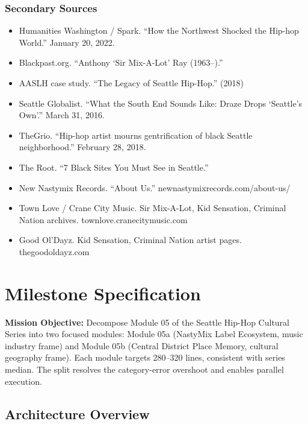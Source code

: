 \documentclass[11pt,letterpaper]{article}
\newcommand{\stageheader}[2]{%
  \noindent\colorbox{#2}{\makebox[\textwidth][l]{%
    \textcolor{white}{\bfseries\sffamily\hspace{6pt}#1\hspace{6pt}}}}%
  \vspace{0.5em}\par%
}
\newcommand{\metafield}[2]{\textbf{\sffamily #1} #2\par}
\begin{document}
\subsubsection{Secondary Sources}
\begin{itemize}
\item Humanities Washington / Spark. ``How the Northwest Shocked the Hip-hop World.'' January 20, 2022.
\item Blackpast.org. ``Anthony `Sir Mix-A-Lot' Ray (1963--).''
\item AASLH case study. ``The Legacy of Seattle Hip-Hop.'' (2018)
\item Seattle Globalist. ``What the South End Sounds Like: Draze Drops `Seattle's Own'.'' March 31, 2016.
\item TheGrio. ``Hip-hop artist mourns gentrification of black Seattle neighborhood.'' February 28, 2018.
\item The Root. ``7 Black Sites You Must See in Seattle.''
\item New Nastymix Records. ``About Us.'' newnastymixrecords.com/about-us/
\item Town Love / Crane City Music. Sir Mix-A-Lot, Kid Sensation, Criminal Nation archives. townlove.cranecitymusic.com
\item Good Ol'Dayz. Kid Sensation, Criminal Nation artist pages. thegoodoldayz.com
\end{itemize}

\newpage
\stageheader{STAGE 3 --- MISSION PACKAGE}{tertiary}

\section{Milestone Specification}

\metafield{Mission Objective:}{Decompose Module 05 of the Seattle Hip-Hop Cultural Series into two focused modules:
Module 05a (NastyMix Label Ecosystem, music industry frame) and Module 05b (Central District Place Memory,
cultural geography frame). Each module targets 280--320 lines, consistent with series median.
The split resolves the category-error overshoot and enables parallel execution.}

\subsection{Architecture Overview}
\end{document}
